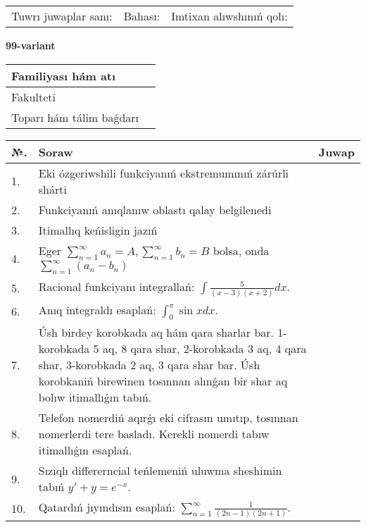 \documentclass{article}
\begin{document}
\vspace{1cm}

\begin{tabular}{ c c c }
Tuwrı juwaplar sanı: \underline{\hspace{2cm}} & Bahası: \underline{\hspace{2cm}} & Imtixan alıwshınıń qolı: \underline{\hspace{2cm}} \\
\end{tabular}

\newpage

\begin{center}\textbf{99-variant}\end{center}

\bgroup
\def\arraystretch{1.5}
\begin{tabular}{ |m{6cm}|m{10cm}| }
  \hline
  Familiyası hám atı & \\
  \hline
  Fakulteti &\\
  \hline
  Toparı hám tálim baǵdarı & \\
  \hline
\end{tabular}
\egroup

\vspace{0.5cm}

\bgroup
\def\arraystretch{2}
\begin{tabular}{ |l|m{8cm}|m{7cm}| }
  \hline
  №. & Soraw & Juwap \\
  \hline
  1. & Eki ózgeriwshili funkciyanıń ekstremumınıń zárúrli shárti &  \\
  \hline
  2. & Funkciyanıń anıqlanıw oblastı qalay belgilenedi &  \\
  \hline
  3. & Itimallıq keńisligin jazıń &  \\
  \hline
  4. & Eger $\displaystyle\sum_{n = 1}^{\infty}a_{n} = A, \sum_{n = 1}^{\infty}b_{n} = B$ bolsa, onda $\displaystyle\sum_{n = 1}^{\infty}\left( a_{n} - b_{n} \right)$ &  \\
  \hline
  5. & Racional funkciyanı integrallań: $\displaystyle\int {\frac{5}{(x - 3)(x + 2)}dx}$. &  \\
  \hline
  6. & Anıq integraldı esaplań: $\displaystyle\int_{0}^{\pi}\sin xdx$. &  \\
  \hline
  7. & Úsh birdey korobkada aq hám qara sharlar bar. 1-korobkada 5 aq, 8 qara shar, 2-korobkada 3 aq, 4 qara shar, 3-korobkada 2 aq, 3 qara shar bar. Úsh korobkaniń birewinen tosınnan alınǵan bir shar aq bolıw itimallıǵın tabıń. &  \\
  \hline
  8. & Telefon nomerdiń aqırǵı eki cifrasın umıtıp, tosınnan nomerlerdi tere basladı. Kerekli nomerdi tabıw itimallıǵın esaplań. &  \\
  \hline
  9. & Sızıqlı differerncial teńlemeniń uluwma sheshimin tabıń $y' + y =e^{-x}$. &  \\
  \hline
  10. & Qatardıń jıyındısın esaplań: $\displaystyle\sum_{n = 1}^{\infty}\frac{1}{(2n - 1)(2n + 1)}$. &  \\
  \hline
\end{tabular}
\egroup
\end{document}
